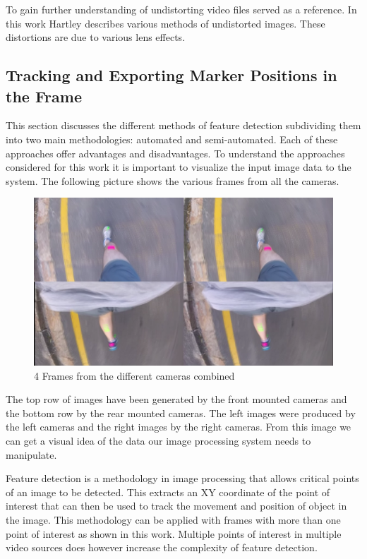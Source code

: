 To gain further understanding of undistorting video files \cite{Hartley2004} served as a reference. In this work Hartley describes various methods of undistorted images. These distortions are due to various lens effects.

\subsection{Tracking and Exporting Marker Positions in the Frame}

This section discusses the different methods of feature detection subdividing them into two main methodologies: automated and semi-automated. Each of these approaches offer advantages and disadvantages. To understand the approaches considered for this work it is important to visualize the input image data to the system. The following picture shows the various frames from all the cameras.

\begin{figure}[!ht]
  \includegraphics[width=\linewidth]{figures/pat_run_quad.png}
  \caption{4 Frames from the different cameras combined}
  \label{fig:pat_run_quad}
\end{figure}

The top row of images have been generated by the front mounted cameras and the bottom row by the rear mounted cameras. The left images were produced by the left cameras and the right images by the right cameras. From this image we can get a visual idea of the data our image processing system needs to manipulate.

Feature detection is a methodology in image processing that allows critical points of an image to be detected. This extracts an XY coordinate of the point of interest that can then be used to track the movement and position of object in the image. This methodology can be applied with frames with more than one point of interest as shown in this work. Multiple points of interest in multiple video sources does however increase the complexity of feature detection.

